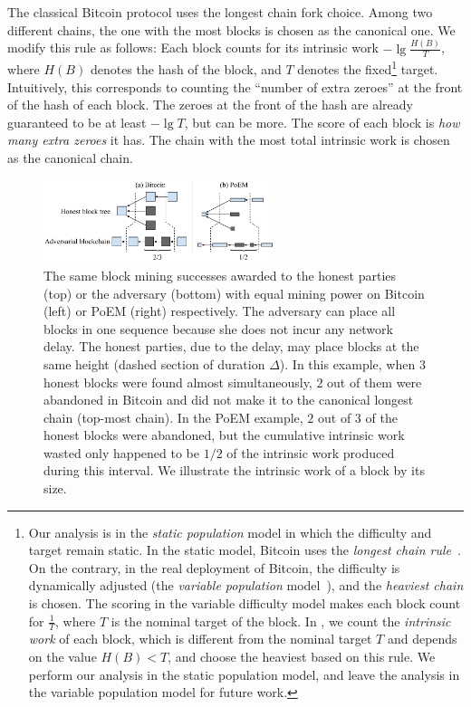 \noindent
{}
The classical Bitcoin protocol uses the longest chain fork choice. Among two different
chains, the one with the most blocks is chosen as the canonical one. We modify this
rule as follows: Each block counts for its intrinsic work $-\lg \frac{H(B)}{T}$,
where $H(B)$ denotes the hash of the block, and $T$ denotes the fixed\footnote{Our
analysis is in the \emph{static population} model in which the difficulty
and target remain static. In the static model, Bitcoin uses the \emph{longest chain rule}~\cite{backbone}.
On the contrary, in the real deployment of Bitcoin, the difficulty is dynamically adjusted (the
\emph{variable population} model~\cite{varbackbone}), and the \emph{heaviest chain} is chosen.
The scoring in the variable difficulty model makes each block count for $\frac{1}{T}$, where
$T$ is the nominal target of the block. In \poem, we count the \emph{intrinsic work}
of each block, which is different from the nominal target $T$ and depends on the value $H(B) < T$,
and choose the heaviest based on this rule.
We perform our analysis in the static population model, and leave the analysis in the variable
population model for future work.} target. Intuitively, this corresponds to counting the
``number of extra zeroes'' at the front of the hash of each block. The zeroes at the front of the hash are already guaranteed
to be at least $-\lg T$, but can be more. The score of each block is \emph{how many extra zeroes}
it has. The chain with the most total intrinsic work is chosen as the canonical chain.

\begin{figure}
  \centering
  \includegraphics[width=0.6\textwidth,keepaspectratio]{figures/poem_work_wasted.pdf}
  \caption{The same block mining successes awarded to the honest parties (top) or the adversary (bottom)
           with equal mining power on Bitcoin (left) or PoEM (right) respectively. The adversary can place
           all blocks in one sequence because she does not incur any network delay. The honest parties,
           due to the delay, may place blocks at the same height (dashed section of duration $\Delta$).
           In this example, when $3$ honest blocks were found almost simultaneously, $2$ out of
           them were abandoned in Bitcoin and did not make it to the canonical longest chain
           (top-most chain).
           In the PoEM example, $2$ out of $3$ of the honest blocks were abandoned, but the cumulative intrinsic
           work wasted only happened to be $1/2$ of the intrinsic work produced during this interval.
           We illustrate the intrinsic work of a block by its size.}
  \label{fig:poem-wasted-work}
\end{figure}

